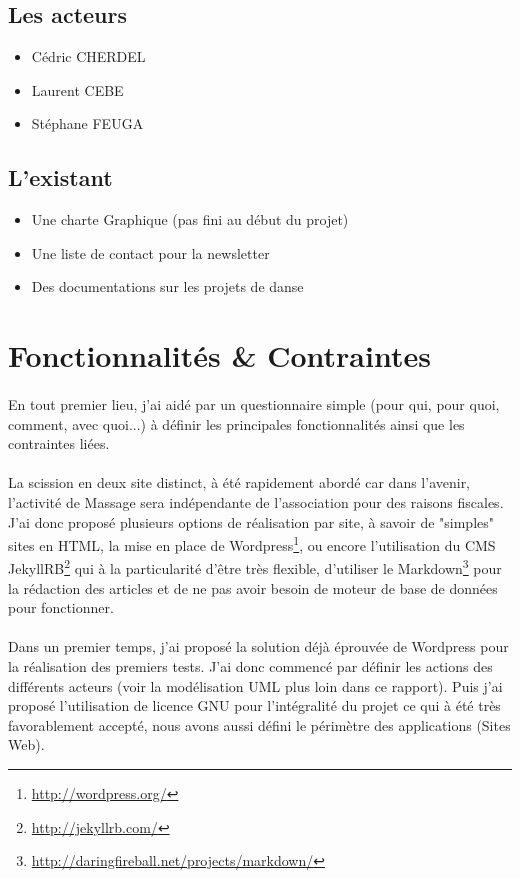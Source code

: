 \documentclass[11pt,a4paper,twoside]{report}
\begin{document}
		\subsection{Les acteurs}
			\begin{itemize}
				\item Cédric CHERDEL
				\item Laurent CEBE
				\item Stéphane FEUGA
			\end{itemize}
		\subsection{L'existant}
			\begin{itemize}
				\item Une charte Graphique (pas fini au début du projet)
				\item Une liste de contact pour la newsletter
				\item Des documentations sur les projets de danse
			\end{itemize}
	\section{Fonctionnalités \& Contraintes}
		\paragraph*{}En tout premier lieu, j'ai aidé par un questionnaire simple (pour qui, pour quoi, comment, avec quoi...) à définir les principales fonctionnalités ainsi que les contraintes liées.
		\paragraph*{}La scission en deux site distinct, à été rapidement abordé car dans l'avenir, l'activité de Massage sera indépendante de l'association pour des raisons fiscales. J'ai donc proposé plusieurs options de réalisation par site, à savoir de "simples" sites en HTML, la mise en place de Wordpress\footnote{\url{http://wordpress.org/}}, ou encore l'utilisation du CMS JekyllRB\footnote{\url{http://jekyllrb.com/}} qui à la particularité d'être très flexible, d'utiliser le Markdown\footnote{\url{http://daringfireball.net/projects/markdown/}} pour la rédaction des articles et de ne pas avoir besoin de moteur de base de données pour fonctionner.
		\paragraph*{}Dans un premier temps, j'ai proposé la solution déjà éprouvée de Wordpress pour la réalisation des premiers tests. J'ai donc commencé par définir les actions des différents acteurs (voir la modélisation UML plus loin dans ce rapport). Puis j'ai proposé l'utilisation de licence GNU pour l'intégralité du projet ce qui à été très favorablement accepté, nous avons aussi défini le périmètre des applications (Sites Web).
\end{document}
